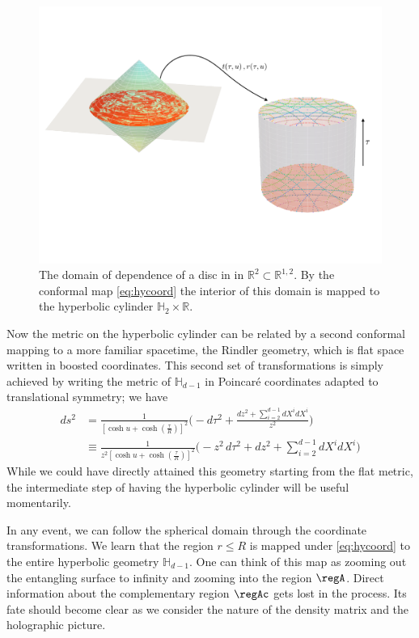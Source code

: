 \documentclass[12pt,openany]{book}
\begin{document}
\begin{figure}[htbp]
\begin{center}
\includegraphics[width=5in]{figures/chm-map}
\end{center}
\caption{The domain of dependence of a disc in in ${\mathbb R}^2 \subset {\mathbb R}^{1,2}$. By the conformal map
\eqref{eq:hycoord} the interior of this domain is mapped to the hyperbolic cylinder $\mathbb{H}_2 \times {\mathbb R}$.}
\label{f:chmmaps}
\end{figure}
%

Now the metric on the hyperbolic cylinder can be related by a second conformal mapping to a more familiar spacetime, the Rindler geometry, which is flat space written in boosted coordinates. This second set of transformations is simply achieved by writing the metric of $\mathbb{H}_{d-1}$ in Poincar\'e coordinates adapted to translational symmetry; we have
%
\begin{align}
ds^2 &= \frac{1}{\left[\cosh u + \cosh\left(\frac{\tau}{R}\right) \right]^2 }
\Bigg(-d\tau^2 +  \frac{dz^2  + \sum_{i=2}^{d-1} dX^i dX^i}{z^2}\Bigg) \nonumber \\
&\equiv
\frac{1}{z^2 \left[\cosh u + \cosh\left(\frac{\tau}{R}\right) \right]^2 }
\Bigg(-z^2 \, d\tau^2 +  dz^2  + \sum_{i=2}^{d-1} dX^i dX^i \Bigg)
\label{eq:rindlerhc}
\end{align}
%
While we could have directly attained this geometry starting from the flat metric, the intermediate step of having the hyperbolic cylinder will be useful momentarily.

In any event, we can follow the spherical domain through the coordinate transformations. We learn that the region $r \leq R$ is mapped under \eqref{eq:hycoord} to the entire hyperbolic geometry $\mathbb{H}_{d-1}$. One can think of this map as zooming out  the entangling surface  to infinity and zooming into the region $\regA$. Direct information about the complementary region $\regAc$ gets lost in the process. Its fate should become clear as we consider the nature of the density matrix and the holographic picture.
\end{document}
